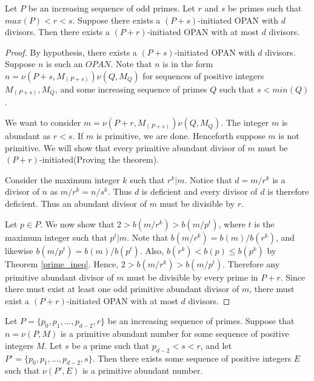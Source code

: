 \documentclass[../paper.tex]{subfiles}
\begin{document}


\begin{theorem}
\label{Divisibility}
Let $P$ be an increasing sequence of odd primes. Let $r$ and $s$ be
primes such that $max(P) < r < s$. Suppose there exists a $(P +
s)$-initiated OPAN with $d$ divisors. Then there exists a $(P +
r)$-initiated OPAN with at most $d$ divisors. 
\end{theorem}

\begin{proof}
By hypothesis, there exists a $(P + s)$-initiated OPAN with $d$ divisors.
Suppose $n$ is such an $OPAN$. Note that $n$ is in the form $n =
\nu(P + s, M_{(P + s)}) \nu(Q, M_Q)$ for sequences of positive 
integers $M_{(P + s)}, M_Q$, and some increasing sequence of
primes $Q$ such that $s < min(Q)$.

  We want to consider $m = \nu(P + r, M_{(P + s)}) \nu(Q, M_Q)$. 
The integer $m$ is abundant as $r < s$. If $m$ is primitive,
we are done. Henceforth suppose $m$ is not primitive. 
We will show that every primitive abundant divisor of $m$ must be 
$(P + r)$-initiated(Proving the theorem).

  Consider the maximum integer
$k$ such that $r^k | m$. Notice that $d = m / r^k$ is a divisor of $n$
as $m / r^k = n / s^k$. Thus $d$ is deficient and every divisor of
$d$ is therefore deficient. Thus an abundant divisor of $m$ must
be divisible by $r$.

Let $p \in P$.  We now show that $2 > b(m / r^k) > b(m / p^t)$, 
where $t$ is the maximum integer such that $p^t | m$. Note that
$b(m / r^k) = b(m) / b(r^k)$, and likewise $b(m / p^t) = b(m) /
b(p^t)$. Also, $b(r^k) < b(p) \leq b(p^k)$ by Theorem {\ref{prime_ineq}}. 
Hence, $2 > b(m / r^k) > b(m / p^t)$. Therefore any primitive
abundant divisor of $m$ must be divisible by every prime in 
$P + r$. Since there must exist at least one odd primitive 
abundant divisor of $m$, there must exist a $(P + r)$-initiated 
OPAN with at most $d$ divisors.
\end{proof}

\begin{coro}\label{Continuity}
Let $P = \{p_0, p_1, ..., p_{d-2}, r\}$ be an increasing sequence 
of primes. Suppose that $n = \nu(P, M)$ is a primitive abundant 
number for some sequence of positive integers $M$. Let $s$ be a 
prime such that $p_{d-2} < s < r$, and let $P' = \{p_0, p_1,...,
p_{d-2}, s\}$. Then there exists some sequence of positive integers
$E$ such that $\nu(P', E)$ is a primitive abundant number.
\end{coro}
\end{document}

